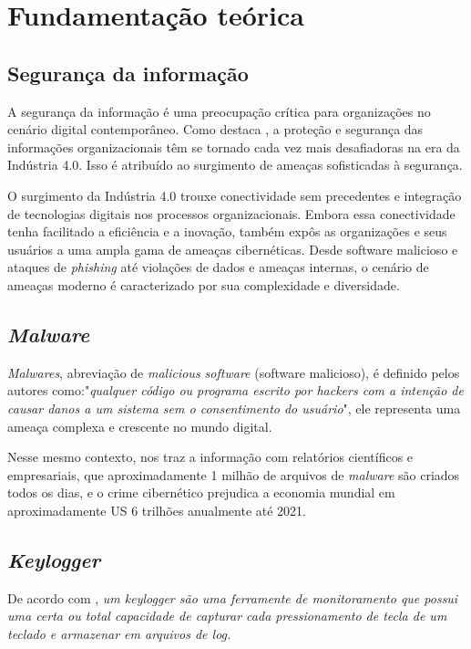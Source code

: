 \documentclass[12pt]{article}
\begin{document}
\section{Fundamentação teórica}

\subsection{Segurança da informação}
A segurança da informação é uma preocupação crítica para organizações no cenário digital contemporâneo. Como destaca \citep{bhaharin2019issues} , a proteção e segurança das informações organizacionais têm se tornado cada vez mais desafiadoras na era da Indústria 4.0. Isso é atribuído ao surgimento de ameaças sofisticadas à segurança.

O surgimento da Indústria 4.0 trouxe conectividade sem precedentes e integração de tecnologias digitais nos processos organizacionais. Embora essa conectividade tenha facilitado a eficiência e a inovação, também expôs as organizações e seus usuários a uma ampla gama de ameaças cibernéticas. Desde software malicioso e ataques de \textit{phishing} até violações de dados e ameaças internas, o cenário de ameaças moderno é caracterizado por sua complexidade e diversidade.
\subsection{\textit{Malware}}
\textit{Malwares}, abreviação de \textit{malicious software} (software malicioso), é definido pelos autores \citep{singh2021keylogger} como:"\textit{qualquer código ou programa escrito por hackers com a intenção de causar danos a um sistema sem o consentimento do usuário}", ele representa uma ameaça complexa e crescente no mundo digital.

Nesse mesmo contexto, \citep{singh2018infringement} nos traz a informação com relatórios científicos e empresariais, que aproximadamente 1 milhão de arquivos de \textit{malware} são criados todos os dias, e o crime cibernético prejudica a economia mundial em aproximadamente US 6 trilhões anualmente até 2021.

\subsection{\textit{Keylogger}}
De acordo com \citep{wajahat2019novel}, \textit{um \textit{keylogger} são uma ferramente de monitoramento que possui uma certa ou total capacidade de capturar cada pressionamento de tecla de um teclado e armazenar em arquivos de log.}
\end{document}
